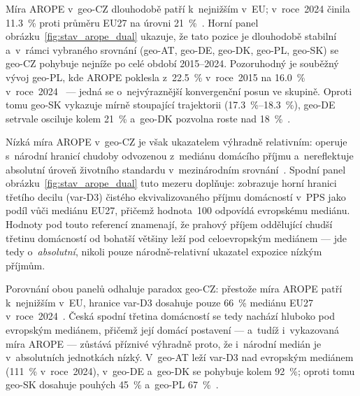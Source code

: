 Míra \ac{AROPE} v~\acl{geo-CZ} dlouhodobě patří k~nejnižším v~\ac{EU}; v~roce~2024 činila \SI{11,3}{\percent} proti průměru \ac{EU}27 na úrovni \SI{21}{\percent}~\cite{eurostat_ilc_peps01n_PC_pop}.
Horní panel obrázku~\ref{fig:stav_arope_dual} ukazuje, že tato pozice je dlouhodobě stabilní a~v~rámci vybraného srovnání (\acl{geo-AT}, \acl{geo-DE}, \acl{geo-DK}, \acl{geo-PL}, \acl{geo-SK}) se \acs{geo-CZ} pohybuje nejníže po celé období 2015--2024.
Pozoruhodný je souběžný vývoj \acs{geo-PL}, kde \ac{AROPE} poklesla z~\SI{22,5}{\percent} v~roce~2015 na \SI{16,0}{\percent} v~roce~2024~\cite{eurostat_ilc_peps01n_PC_pop} --- jedná se o~nejvýraznější konvergenční posun ve skupině.
Oproti tomu \acs{geo-SK} vykazuje mírně stoupající trajektorii (\SIrange{17,3}{18,3}{\percent}), \acs{geo-DE} setrvale osciluje kolem \SI{21}{\percent} a~\acs{geo-DK} pozvolna roste nad \SI{18}{\percent}~\cite{eurostat_ilc_peps01n_PC_pop}.

Nízká míra \ac{AROPE} v~\acs{geo-CZ} je však ukazatelem výhradně relativním: operuje s~národní hranicí chudoby odvozenou z~mediánu domácího příjmu a~nereflektuje absolutní úroveň životního standardu v~mezinárodním srovnání~\cite{eurostat_ilc_peps01n_PC_pop}.
Spodní panel obrázku~\ref{fig:stav_arope_dual} tuto mezeru doplňuje: zobrazuje horní hranici třetího decilu (\acs{var-D3}) čistého ekvivalizovaného příjmu domácností v~\ac{PPS} jako podíl vůči mediánu \ac{EU}27, přičemž hodnota~100 odpovídá evropskému mediánu.
Hodnoty pod touto referencí znamenají, že prahový příjem oddělující chudší třetinu domácností od bohatší většiny leží pod celoevropským mediánem --- jde tedy o~\emph{absolutní}, nikoli pouze národně-relativní ukazatel expozice nízkým příjmům.

Porovnání obou panelů odhaluje paradox \acs{geo-CZ}: přestože míra \ac{AROPE} patří k~nejnižším v~\ac{EU}, hranice \acs{var-D3} dosahuje pouze \SI{66}{\percent} mediánu \ac{EU}27 v~roce~2024~\cite{eurostat_ilc_di01_D3_PPS}.
Česká spodní třetina domácností se tedy nachází hluboko pod evropským mediánem, přičemž její domácí postavení --- a~tudíž i~vykazovaná míra \ac{AROPE} --- zůstává příznivé výhradně proto, že i~národní medián je v~absolutních jednotkách nízký.
V~\acs{geo-AT} leží \acs{var-D3} nad evropským mediánem (\SI{111}{\percent} v~roce~2024), v~\acs{geo-DE} a~\acs{geo-DK} se pohybuje kolem \SI{92}{\percent}; oproti tomu \acs{geo-SK} dosahuje pouhých \SI{45}{\percent} a~\acs{geo-PL} \SI{67}{\percent}~\cite{eurostat_ilc_di01_D3_PPS}.

